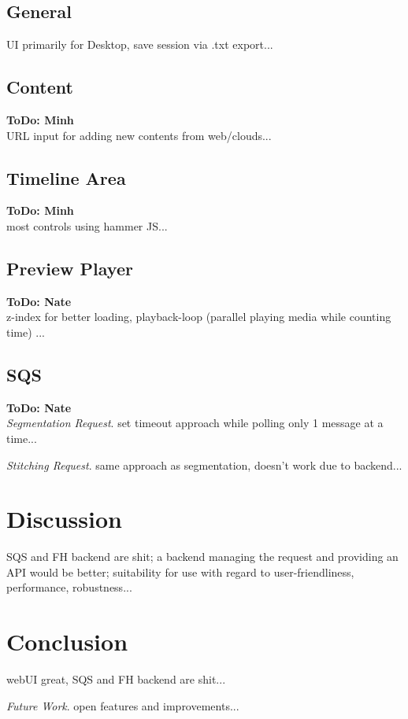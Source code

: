 \documentclass[conference]{IEEEtran}
\begin{document}
\subsection{General}
UI primarily for Desktop, save session via .txt export...

\subsection{Content}
\textbf{ToDo: Minh} \\
URL input for adding new contents from web/clouds...

\subsection{Timeline Area}
\textbf{ToDo: Minh} \\
most controls using hammer JS...

\subsection{Preview Player}
\textbf{ToDo: Nate} \\
z-index for better loading, playback-loop (parallel playing media while counting time) ...

\subsection{SQS}
\textbf{ToDo: Nate} \\
\textit{Segmentation Request}.
set timeout approach while polling only 1 message at a time...

\textit{Stitching Request}.
same approach as segmentation, doesn't work due to backend...

\section{Discussion}
SQS and FH backend are shit; a backend managing the request and providing an API would be better; suitability for use with regard to user-friendliness, performance, robustness...

\section{Conclusion}
webUI great, SQS and FH backend are shit...

\textit{Future Work}. open features and improvements...
\end{document}
